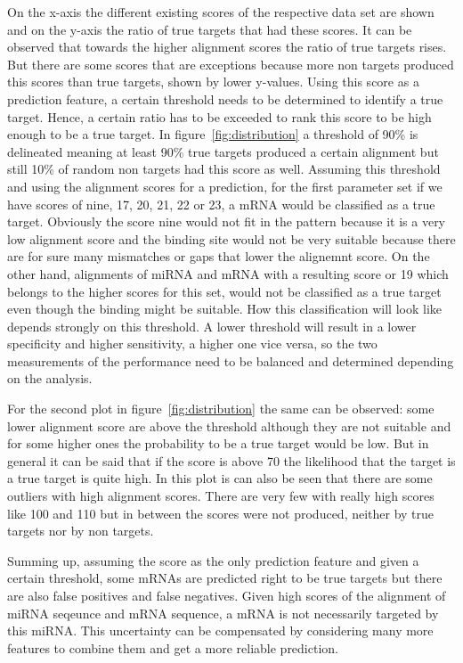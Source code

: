 \documentclass[12pt]{article}
\begin{document}
On the x-axis the different existing scores of the respective data set are shown and on the y-axis the ratio of true targets that had these scores. It can be observed that towards the higher alignment scores the ratio of true targets rises. But there are some scores that are exceptions because more non targets produced this scores than true targets, shown by lower y-values. Using this score as a prediction feature, a certain threshold needs to be determined to identify a true target. Hence, a certain ratio has to be exceeded to rank this score to be high enough to be a true target. In figure~\ref{fig:distribution} a threshold of 90\% is delineated meaning at least 90\% true targets produced a certain alignment but still 10\% of random non targets had this score as well. Assuming this threshold and using the alignment scores for a prediction, for the first parameter set if we have scores of nine, 17, 20, 21, 22 or 23, a mRNA would be classified as a true target. Obviously the score nine would not fit in the pattern because it is a very low alignment score and the binding site would not be very suitable because there are for sure many mismatches or gaps that lower the alignemnt score. On the other hand, alignments of miRNA and mRNA with a resulting score or 19 which belongs to the higher scores for this set, would not be classified as a true target even though the binding might be suitable. How this classification will look like depends strongly on this threshold. A lower threshold will result in a lower specificity and higher sensitivity, a higher one vice versa, so the two measurements of the performance need to be balanced and determined depending on the analysis.

For the second plot in figure~\ref{fig:distribution} the same can be observed: some lower alignment score are above the threshold although they are not suitable and for some higher ones the probability to be a true target would be low. But in general it can be said that if the score is above 70 the likelihood that the target is a true target is quite high. In this plot is can also be seen that there are some outliers with high alignment scores. There are very few with really high scores like 100 and 110 but in between the scores were not produced, neither by true targets nor by non targets.  

Summing up, assuming the score as the only prediction feature and given a certain threshold, some mRNAs are predicted right to be true targets but there are also false positives and false negatives. Given high scores of the alignment of miRNA seqeunce and mRNA sequence, a mRNA is not necessarily targeted by this miRNA. This uncertainty can be compensated by considering many more features to combine them and get a more reliable prediction.\\\\ 
\end{document}
